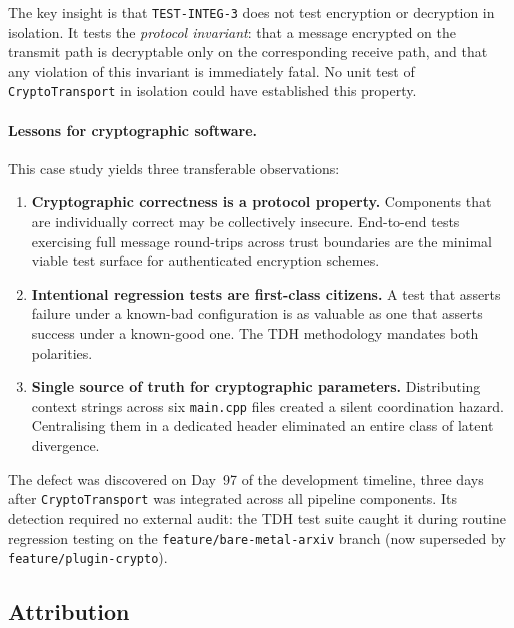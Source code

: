 \documentclass[11pt,a4paper]{article}
\begin{document}
    The key insight is that \texttt{TEST-INTEG-3} does not test encryption or
    decryption in isolation. It tests the \emph{protocol invariant}: that a
    message encrypted on the transmit path is decryptable only on the
    corresponding receive path, and that any violation of this invariant is
    immediately fatal. No unit test of \texttt{CryptoTransport} in isolation
    could have established this property.

    \paragraph{Lessons for cryptographic software.}
    This case study yields three transferable observations:

    \begin{enumerate}
        \item \textbf{Cryptographic correctness is a protocol property.}
        Components that are individually correct may be collectively
        insecure. End-to-end tests exercising full message round-trips
        across trust boundaries are the minimal viable test surface for
        authenticated encryption schemes.

        \item \textbf{Intentional regression tests are first-class citizens.}
        A test that asserts failure under a known-bad configuration is as
        valuable as one that asserts success under a known-good one. The
        TDH methodology mandates both polarities.

        \item \textbf{Single source of truth for cryptographic parameters.}
        Distributing context strings across six \texttt{main.cpp} files
        created a silent coordination hazard. Centralising them in a
        dedicated header eliminated an entire class of latent divergence.
    \end{enumerate}

    The defect was discovered on Day~97 of the development timeline, three days
    after \texttt{CryptoTransport} was integrated across all pipeline components.
    Its detection required no external audit: the TDH test suite caught it during
    routine regression testing on the \texttt{feature/bare-metal-arxiv} branch
    (now superseded by \texttt{feature/plugin-crypto}).

    \subsection{Attribution}
\end{document}
